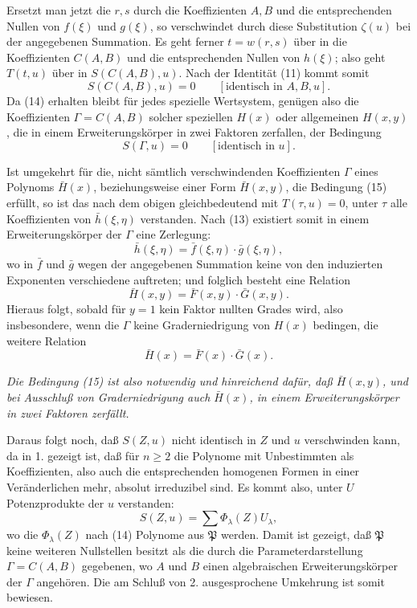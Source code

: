 Ersetzt man jetzt die $r,s$ durch die Koeffizienten $A,B$ und die entsprechenden Nullen von $f(\xi)$ und $g(\xi)$, so verschwindet durch diese Substitution $\zeta(u)$ bei der angegebenen Summation. Es geht ferner $t=w(r,s)$ über in die Koeffizienten $C(A,B)$ und die entsprechenden Nullen von $h(\xi)$; also geht $T(t,u)$ über in $S(C(A,B),u)$. Nach der Identität (11) kommt somit
\begin{equation}
 S(C(A,B),u)=0\qquad[\text{identisch in }A,B,u].
\tag{14}
\end{equation}
Da (14) erhalten bleibt für jedes spezielle Wertsystem, genügen also die Koeffizienten $\Gamma=C(A,B)$ solcher speziellen $H(x)$ oder allgemeinen $H(x,y)$, die in einem Erweiterungskörper in zwei Faktoren zerfallen, der Bedingung
\begin{equation}
 S(\Gamma,u)=0\qquad[\text{identisch in }u].
\tag{15}
\end{equation}

Ist umgekehrt für die, nicht sämtlich verschwindenden Koeffizienten $\Gamma$ eines Polynoms $\bar H(x)$, beziehungsweise einer Form $\bar H(x,y)$, die Bedingung (15) erfüllt, so ist das nach dem obigen gleichbedeutend mit $T(\tau,u)=0$, unter $\tau$ alle Koeffizienten von $\bar h(\xi,\eta)$ verstanden. Nach (13) existiert somit in einem Erweiterungskörper der $\Gamma$ eine Zerlegung:
\[
 \bar h(\xi,\eta)=\bar f(\xi,\eta)\cdot\bar g(\xi,\eta),
\]
wo in $\bar f$ und $\bar g$ wegen der angegebenen Summation keine von den induzierten Exponenten verschiedene auftreten; und folglich besteht eine Relation
\[
 \bar H(x,y)=\bar F(x,y)\cdot\bar G(x,y).
\]
Hieraus folgt, sobald für $y=1$ kein Faktor nullten Grades wird, also insbesondere, wenn die $\Gamma$ keine Graderniedrigung von $H(x)$ bedingen, die weitere Relation
\[
 \bar H(x)=\bar F(x)\cdot\bar G(x).
\]

\emph{Die Bedingung (15) ist also notwendig und hinreichend dafür, daß $\bar H(x,y)$, und bei Ausschluß von Graderniedrigung auch $\bar H(x)$, in einem Erweiterungskörper in zwei Faktoren zerfällt.}

Daraus folgt noch, daß $S(Z,u)$ nicht identisch in $Z$ und $u$ verschwinden kann, da in 1. gezeigt ist, daß für $n\ge2$ die Polynome mit Unbestimmten als Koeffizienten, also auch die entsprechenden homogenen Formen in einer Veränderlichen mehr, absolut irreduzibel sind. Es kommt also, unter $U$ Potenzprodukte der $u$ verstanden:
\[
 S(Z,u)=\sum \Phi_\lambda(Z)U_\lambda,
\]
wo die $\Phi_\lambda(Z)$ nach (14) Polynome aus $\mathfrak P$ werden. Damit ist gezeigt, daß $\mathfrak P$ keine weiteren Nullstellen besitzt als die durch die Parameterdarstellung $\Gamma=C(A,B)$ gegebenen, wo $A$ und $B$ einen algebraischen Erweiterungskörper der $\Gamma$ angehören. Die am Schluß von 2. ausgesprochene Umkehrung ist somit bewiesen.

